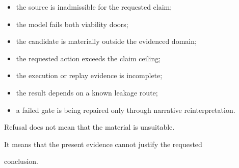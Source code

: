 \documentclass[11pt,a4paper,oneside]{report}
\begin{document}
\begin{itemize}



\item

the source is inadmissible for the requested claim;



\item

the model fails both viability doors;



\item

the candidate is materially outside the evidenced domain;



\item

the requested action exceeds the claim ceiling;



\item

the execution or replay evidence is incomplete;



\item

the result depends on a known leakage route;



\item

a failed gate is being repaired only through narrative reinterpretation.



\end{itemize}



Refusal does not mean that the material is unsuitable.



It means that the present evidence cannot justify the requested

conclusion.
\end{document}
